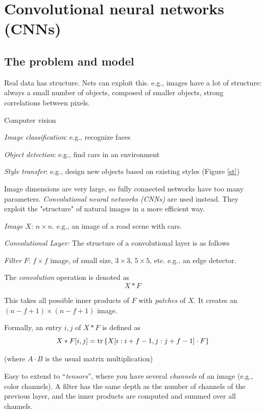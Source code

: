 \documentclass[english]{article}
\begin{document}
\eenum



\section{Convolutional neural networks (CNNs)}
\subsection{The problem and model}
\benum
\item Real data has structure. Nets can exploit this. e.g., images have a lot of structure: always a small number of objects, composed of smaller objects, strong correlations between pixels. 


Computer vision
\benum
\item \emph{Image classification}: e.g., recognize faces 
\item \emph{Object detection}: e.g., find cars in an environment
\item \emph{Style transfer}: e.g., design new objects based on existing styles (Figure \ref{st})

\eenum
Image dimensions are very large, so fully connected networks have too many parameters. \emph{Convolutional neural networks (CNNs)} are used instead. They exploit the "structure" of natural images in a more efficient way. 

\item \emph{Image} $X$: $n\times n$. e.g., an image of a road scene with cars.

\item \emph{Convolutional Layer:} The structure of a convolutional layer is as follows

\benum 
\item 
\emph{Filter} $F$: $ f\times f$ image, of small size, $3 \times 3$, $5 \times 5$, etc. e.g., an edge detector.

The \emph{convolution} operation is denoted as 
$$X * F$$

This takes all possible inner products of $F$ with \emph{patches} of $X$. It creates an $(n-f+1) \times (n-f+1)$ image.

Formally, an entry $i,j$ of $X * F$ is defined as $$X * F[i,j]=\operatorname{tr} \left\{X[i:i+f-1,j:j+f-1] \cdot F \right\}$$ 

(where $A\cdot B$ is the usual matrix multiplication)

Easy to extend to ``\emph{tensors}'', where you have several \emph{channels} of an image (e.g., color channels). A filter has the same depth as the number of channels of the previous layer, and the inner products are computed and summed over all channels.
\end{document}
